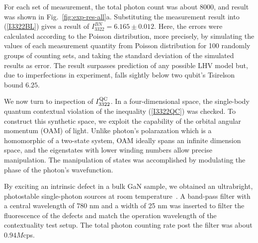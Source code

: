 \documentclass[prl,letterpaper,english,reprint,nofootinbib,aps,superscriptaddress,showpacs,showkeys]{revtex4-1}
\theoremstyle{definition}
\theoremstyle{remark}
\begin{document}
For each set of measurement, the total photon count was about $8000$, and result was shown in Fig.~\ref{fig:exp-res-all}a. Substituting the measurement result into (\ref{I3322BL}) gives a result of $I_{3322}^{BN}=6.165 \pm 0.012$. Here, the errors were calculated according to the Poisson distribution, more precisely, by simulating the values of each measurement quantity from Poisson distribution for 100 randomly groups of counting sets, and taking the standard deviation of the simulated results as error. The result surpasses prediction of any possible LHV model but, due to imperfections in experiment, falls sightly below two qubit's Tsirelson bound $6.25$.

 We now turn to inspection of $I_{3322}^{\rm QC}$. In a four-dimensional space, the single-body quantum contextual violation of the inequality (\ref{I3322QC}) was checked.
 To construct this synthetic space, we exploit the capability of the orbital angular momentum (OAM) of light. Unlike photon's polarazation which is a homomorphic of a two-state system, OAM ideally spans an infinite dimension space, and the eigenstates with lower winding numbers allow precise manipulation.
 The manipulation of states was accomplished by modulating the phase of the photon's wavefunction.

 By exciting an intrinsic defect in a bulk GaN sample, we obtained an ultrabright, photostable single-photon sources at room temperature~\cite{qli18}.
 A band-pass filter with a central wavelength of 780 nm and a width of 25 nm was inserted to filter the fluorescence of the defects and match the operation wavelength of the contextuality test setup. The total photon counting rate post the filter was about $0.94M$cps.
\end{document}
